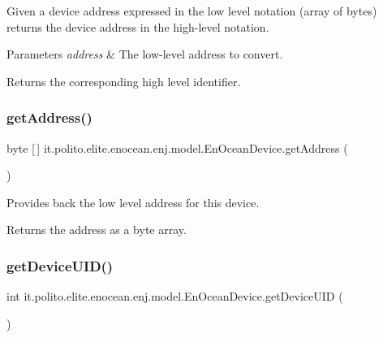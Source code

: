 Given a device address expressed in the low level notation (array of bytes) returns the device address in the high-\/level notation.


\begin{DoxyParams}{Parameters}
{\em address} & The low-\/level address to convert. \\
\hline
\end{DoxyParams}
\begin{DoxyReturn}{Returns}
the corresponding high level identifier. 
\end{DoxyReturn}
\hypertarget{classit_1_1polito_1_1elite_1_1enocean_1_1enj_1_1model_1_1_en_ocean_device_a5580d2482513303b9d4f6d3b0822e324}{}\label{classit_1_1polito_1_1elite_1_1enocean_1_1enj_1_1model_1_1_en_ocean_device_a5580d2482513303b9d4f6d3b0822e324} 
\subsubsection{\texorpdfstring{get\+Address()}{getAddress()}}
{\footnotesize\ttfamily byte \mbox{[}$\,$\mbox{]} it.\+polito.\+elite.\+enocean.\+enj.\+model.\+En\+Ocean\+Device.\+get\+Address (\begin{DoxyParamCaption}{ }\end{DoxyParamCaption})}

Provides back the low level address for this device.

\begin{DoxyReturn}{Returns}
the address as a byte array. 
\end{DoxyReturn}
\hypertarget{classit_1_1polito_1_1elite_1_1enocean_1_1enj_1_1model_1_1_en_ocean_device_acad2c5bf937c5b7af7047fb924fb34b5}{}\label{classit_1_1polito_1_1elite_1_1enocean_1_1enj_1_1model_1_1_en_ocean_device_acad2c5bf937c5b7af7047fb924fb34b5} 
\subsubsection{\texorpdfstring{get\+Device\+U\+I\+D()}{getDeviceUID()}}
{\footnotesize\ttfamily int it.\+polito.\+elite.\+enocean.\+enj.\+model.\+En\+Ocean\+Device.\+get\+Device\+U\+ID (\begin{DoxyParamCaption}{ }\end{DoxyParamCaption})}

